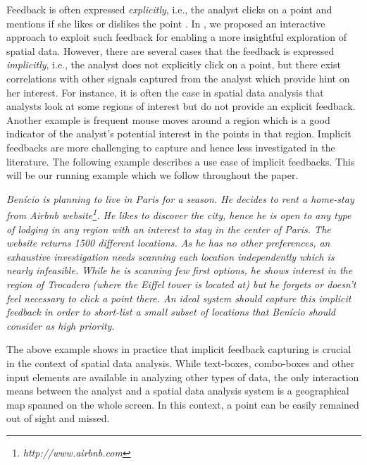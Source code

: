 \documentclass[sigconf,edbt]{acmart-edbt2019}
\begin{document}
\vspace{2pt}
Feedback is often expressed {\em explicitly}, i.e., the analyst clicks on a point and mentions if she likes or dislikes the point \cite{kamat2014distributed,Omidvar-Tehrani:2015,omidvar2017geoguide}. In \cite{omidvar2017geoguide}, we proposed an interactive approach to exploit such feedback for enabling a more insightful exploration of spatial data. However, there are several cases that the feedback is expressed {\em implicitly}, i.e., the analyst does not explicitly click on a point, but there exist correlations with other signals captured from the analyst which provide hint on her interest. For instance, it is often the case in spatial data analysis that analysts look at some regions of interest but do not provide an explicit feedback. Another example is frequent mouse moves around a region which is a good indicator of the analyst's potential interest in the points in that region. Implicit feedbacks are more challenging to capture and hence less investigated in the literature. The following example describes a use case of implicit feedbacks. This will be our running example which we follow throughout the paper.

\vspace{2pt}
 {\em Ben\'icio is planning to live in Paris for a season. He decides to rent a home-stay from \textsf{Airbnb} website\footnote{\it http://www.airbnb.com}. He likes to discover the city, hence he is open to any type of lodging in any region with an interest to stay in the center of Paris. The website returns 1500 different locations. As he has no other preferences, an exhaustive investigation needs scanning each location independently which is nearly infeasible. While he is scanning few first options, he shows interest in the region of Trocadero (where the Eiffel tower is located at) but he forgets or doesn't feel necessary to click a point there. An ideal system should capture this implicit feedback in order to short-list a small subset of locations that Ben\'icio should consider as high priority}.

\vspace{2pt}
The above example shows in practice that implicit feedback capturing is crucial in the context of spatial data analysis. While text-boxes, combo-boxes and other input elements are available in analyzing other types of data, the only interaction means between the analyst and a spatial data analysis system is a geographical map spanned on the whole screen. In this context, a point can be easily remained out of sight and missed.
\end{document}
